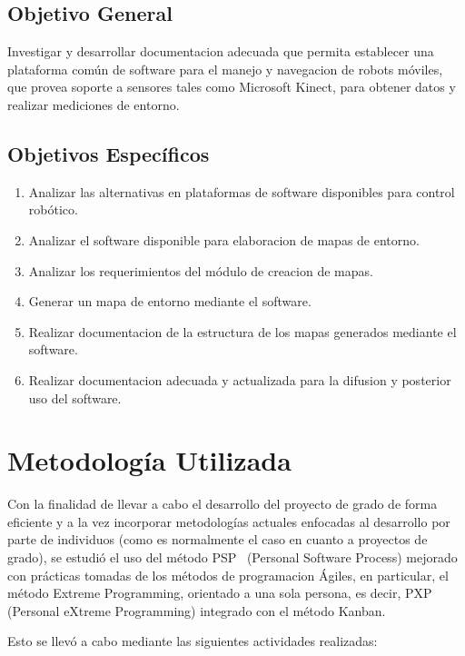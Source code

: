 \subsection{Objetivo General}

Investigar y desarrollar documentacion adecuada que permita establecer una plataforma común de software para el manejo y navegacion de robots móviles, que provea soporte a sensores tales como Microsoft Kinect, para obtener datos y realizar mediciones de entorno.

\subsection{Objetivos Específicos}

\begin{enumerate}
	\itemsep1pt \parskip1pt 
	\item Analizar las alternativas en plataformas de software disponibles para control robótico.
	\item Analizar el software disponible para elaboracion de mapas de entorno.
	\item Analizar los requerimientos del módulo de creacion de mapas.
	\item Generar un mapa de entorno mediante el software.
	\item Realizar documentacion de la estructura de los mapas generados mediante el software.
	\item Realizar documentacion adecuada y actualizada para la difusion y posterior uso del software.
\end{enumerate}

\section{Metodología Utilizada}

Con la finalidad de llevar a cabo el desarrollo del proyecto de grado de forma eficiente y a la vez incorporar metodologías actuales enfocadas al desarrollo por parte de individuos (como es normalmente el caso en cuanto a proyectos de grado), se estudió el uso del método PSP~\citep{Humphrey200503} (Personal Software Process) mejorado con prácticas tomadas de los métodos de programacion Ágiles, en particular, el método Extreme Programming, orientado a una sola persona, es decir, PXP~\citep{pxppaper} (Personal eXtreme Programming) integrado con el método Kanban.

Esto se llevó a cabo mediante las siguientes actividades realizadas:

